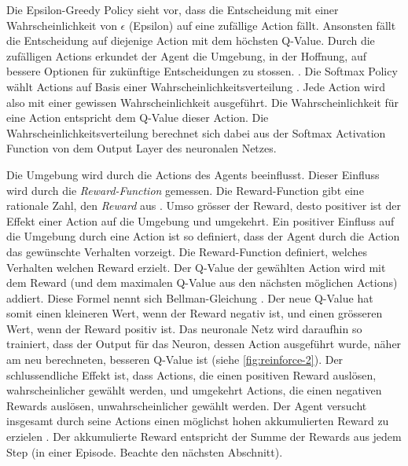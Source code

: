 Die Epsilon-Greedy Policy sieht vor, dass die Entscheidung mit einer
Wahrscheinlichkeit von $\epsilon$ (Epsilon) auf eine zufällige Action fällt.
Ansonsten fällt die Entscheidung auf diejenige Action mit dem höchsten Q-Value.
Durch die zufälligen Actions erkundet der Agent die Umgebung, in der Hoffnung,
auf bessere Optionen für zukünftige Entscheidungen zu stossen.
\cite{coggan_exploration_2004}. Die Softmax Policy wählt Actions auf
Basis einer Wahrscheinlichkeitsverteilung \cite{sutton_23_1997}. Jede
Action wird also mit einer gewissen Wahrscheinlichkeit ausgeführt. Die
Wahrscheinlichkeit für eine Action entspricht dem Q-Value dieser Action. Die
Wahrscheinlichkeitsverteilung berechnet sich dabei aus der Softmax Activation
Function von dem Output Layer des neuronalen Netzes.

Die Umgebung wird durch die Actions des Agents beeinflusst. Dieser Einfluss wird
durch die \emph{Reward-Function} gemessen. Die Reward-Function gibt eine
rationale Zahl, den \emph{Reward} aus \cite[S. 75]{sutton_reinforcement_2014}.
Umso grösser der Reward, desto positiver ist der Effekt einer Action auf die
Umgebung und umgekehrt. Ein positiver Einfluss auf die Umgebung durch eine
Action ist so definiert, dass der Agent durch die Action das gewünschte
Verhalten vorzeigt. Die Reward-Function definiert, welches Verhalten welchen
Reward erzielt. Der Q-Value der gewählten Action wird mit dem Reward (und dem
maximalen Q-Value aus den nächsten möglichen Actions) addiert. Diese Formel
nennt sich Bellman-Gleichung \cite[S. 3]{mnih_playing_2013}. Der neue Q-Value
hat somit einen kleineren Wert, wenn der Reward negativ ist, und einen grösseren
Wert, wenn der Reward positiv ist. Das neuronale Netz wird daraufhin so
trainiert, dass der Output für das Neuron, dessen Action ausgeführt wurde, näher
am neu berechneten, besseren Q-Value ist (siehe \autoref{fig:reinforce-2}). Der
schlussendliche Effekt ist, dass Actions, die einen positiven Reward auslösen,
wahrscheinlicher gewählt werden, und umgekehrt Actions, die einen negativen
Rewards auslösen, unwahrscheinlicher gewählt werden. Der Agent versucht
insgesamt durch seine Actions einen möglichst hohen akkumulierten Reward zu
erzielen \cite[S. 57]{sutton_reinforcement_2014}. Der akkumulierte Reward
entspricht der Summe der Rewards aus jedem Step (in einer Episode. Beachte den
nächsten Abschnitt).
 

